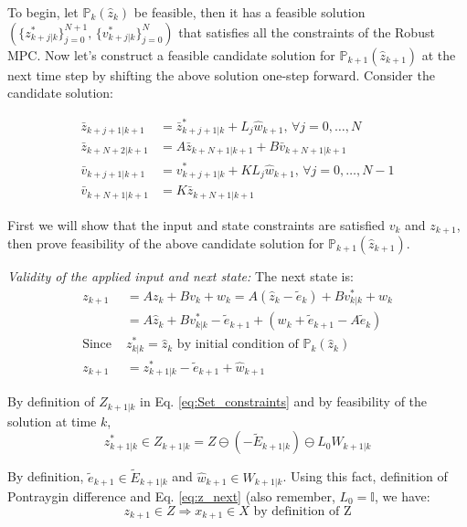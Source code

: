 To begin, let $\mathbb{P}_{k}(\hat{z}_k)$ be feasible, then it has a feasible solution $(\lbrace z^{*}_{k+j|k}\rbrace_{j=0}^{N+1}, \, \lbrace v^{*}_{k+j|k}\rbrace_{j=0}^{N} )$ that satisfies all the constraints of the Robust MPC. Now let's construct a feasible candidate solution for $\mathbb{P}_{k+1}(\hat{z}_{k+1})$ at the next time step by shifting the above solution one-step forward. Consider the candidate solution:

\begin{subequations}
\begin{align}
\label{eq:candidate}
\bar{z}_{k+j+1|k+1} &= \bar{z}^{*}_{k+j+1|k} + L_j\hat{w}_{k+1}, \, \forall j =0,\dotsc,N \\
\bar{z}_{k+N+2|k+1}&= A\bar{z}_{k+N+1|k+1} + B\bar{v}_{k+N+1|k+1} \\
\bar{v}_{k+j+1|k+1}&=v^{*}_{k+j+1|k} + KL_j\hat{w}_{k+1}, \, \forall j =0,\dotsc,N-1 \\
\bar{v}_{k+N+1|k+1}&=K\bar{z}_{k+N+1|k+1} 
\end{align}
\end{subequations}

First we will show that the input and state constraints are satisfied $v_k$ and $z_{k+1}$, then prove feasibility of the above candidate solution for $\mathbb{P}_{k+1}(\hat{z}_{k+1})$.

\textit{Validity of the applied input and next state:}
The next state is:
\begin{subequations}
\begin{align}
\label{eq:z_next}
z_{k+1} &= Az_k + Bv_k + w_k = A(\hat{z}_k-\tilde{e}_k)+Bv^{*}_{k|k}+w_k \\
 &= A\hat{z}_k+Bv^{*}_{k|k}-\tilde{e}_{k+1}+(w_k+\tilde{e}_{k+1}-A\tilde{e}_k) \\
\text{Since }& z^{*}_{k|k}=\hat{z}_k \text{ by initial condition of } \mathbb{P}_{k}(\hat{z}_k) \nonumber \\
z_{k+1}&= z^{*}_{k+1|k} - \tilde{e}_{k+1} + \hat{w}_{k+1}
\end{align}
\end{subequations}

By definition of $Z_{k+1|k}$ in Eq. \ref{eq:Set_constraints} and by feasibility of the solution at time $k$,
\begin{equation}
z^{*}_{k+1|k} \in Z_{k+1|k} = Z \ominus (-\tilde{E}_{k+1|k}) \ominus L_0W_{k+1|k}
\end{equation}

By definition, $\tilde{e}_{k+1} \in \tilde{E}_{k+1|k}$ and $\hat{w}_{k+1} \in  W_{k+1|k}$. Using this fact, definition of Pontraygin difference and Eq. \ref{eq:z_next} (also remember, $L_0 = \mathbb{I}$, we have:
\begin{equation}
z_{k+1}\in Z \Rightarrow x_{k+1} \in X \text{ by definition of Z}
\end{equation}

